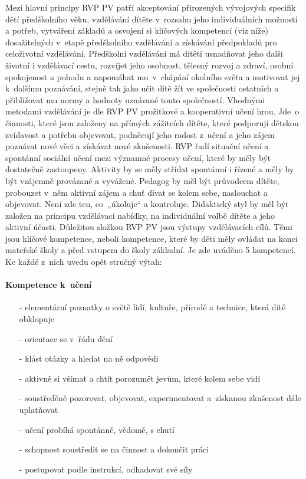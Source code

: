 				Mezi hlavní principy RVP PV patří akceptování přirozených vývojových specifik dětí předškolního věku, vzdělávání dítěte v rozsahu jeho individuálních možností a potřeb, vytváření základů a osvojení si klíčových kompetencí (viz níže) dosažitelných v etapě předškolního vzdělávání a získávání předpokladů pro celoživotní vzdělávání.
				Předškolní vzdělávání má dítěti usnadňovat jeho další životní i vzdělávací cestu, rozvíjet jeho osobnost, tělesný rozvoj a zdraví, osobní spokojenost a pohodu a napomáhat mu v chápání okolního světa a motivovat jej k dalšímu poznávání, stejně tak jako učit dítě žít ve společnosti ostatních a přibližovat mu normy a hodnoty uznávané touto společností.
				Vhodnými metodami vzdělávání je dle RVP PV prožitkové a kooperativní učení hrou. Jde o činnosti, které jsou založeny na přímých zážitcích dítěte, které podporují dětskou zvídavost a potřebu objevovat, podněcují jeho radost z učení a jeho zájem poznávat nové věci a získávat nové zkušenosti.
				RVP řadí situační učení a spontánní sociální učení mezi významné procesy učení, které by měly být dostatečně zastoupeny. Aktivity by se měly střídat spontánní i řízené a měly by být vzájemně provázané a vyvážené. Pedagog by měl být průvodcem dítěte, probouzet v něm aktivní zájem a chuť dívat se kolem sebe, naslouchat a objevovat. Není zde ten, co „úkoluje“ a kontroluje. Didaktický styl by měl být založen na principu vzdělávací nabídky, na individuální volbě dítěte a jeho aktivní účasti.
				Důležitou složkou RVP PV jsou výstupy vzdělávacích cílů. Těmi jsou klíčové kompetence, neboli kompetence, které by děti měly ovládat na konci mateřské školy a před vstupem do školy základní. Je zde uváděno 5 kompetencí. Ke každé z nich uvedu opět stručný výtah:

				\paragraph{Kompetence k učení}
				\begin{itemize}
				\setlength\itemsep{-2mm}
				\item[-] elementární poznatky o světě lidí, kultuře, přírodě a technice, která dítě obklopuje
				\item[-] orientace se v řádu dění
				\item[-] klást otázky a hledat na ně odpovědi
				\item[-] aktivně si všímat a chtít porozumět jevům, které kolem sebe vidí
				\item[-] soustředěně pozorovat, objevovat, experimentovat a získanou zkušenost dále uplatňovat
				\item[-] učení probíhá spontánně, vědomě, s chutí
				\item[-] schopnost soustředit se na činnost a dokončit práci
				\item[-] postupovat podle instrukcí, odhadovat své síly 
				\end{itemize}
				

